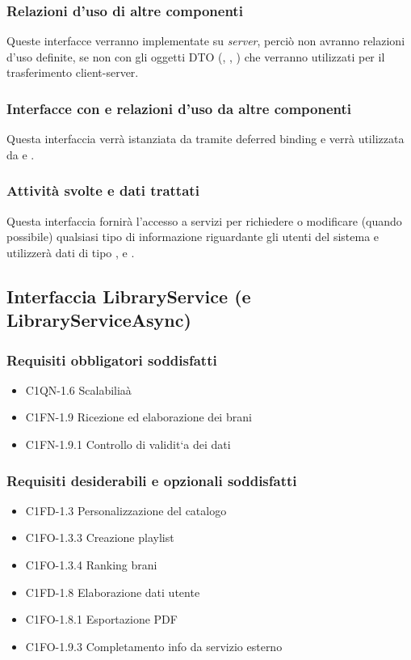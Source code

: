 \subsubsection*{Relazioni d'uso di altre componenti}
Queste interfacce verranno implementate su \emph{server}, perci\`o non
avranno relazioni d'uso definite, se non con gli oggetti DTO (,
, ) che verranno utilizzati per il
trasferimento client-server.
\subsubsection*{Interfacce con e relazioni d'uso da altre componenti}
Questa interfaccia verr\`a istanziata da  tramite deferred
binding e verr\`a utilizzata da  e .
\subsubsection*{Attivit\`a svolte e dati trattati}
Questa interfaccia fornir\`a l'accesso a servizi per richiedere o
modificare (quando possibile) qualsiasi tipo di informazione riguardante gli
utenti del sistema e utilizzer\`a dati di tipo , 
e .

\subsection{Interfaccia LibraryService (e LibraryServiceAsync)}
\subsubsection*{Requisiti obbligatori soddisfatti}
\begin{itemize}
    \item C1QN-1.6 Scalabilia\`a
    \item C1FN-1.9 Ricezione ed elaborazione dei brani
    \item C1FN-1.9.1 Controllo di validit`a dei dati
\end{itemize}
\subsubsection*{Requisiti desiderabili e opzionali soddisfatti}
\begin{itemize}
    \item C1FD-1.3 Personalizzazione del catalogo
    \item C1FO-1.3.3 Creazione playlist
    \item C1FO-1.3.4 Ranking brani
    \item C1FD-1.8 Elaborazione dati utente
    \item C1FO-1.8.1 Esportazione PDF
    \item C1FO-1.9.3 Completamento info da servizio esterno
\end{itemize}
